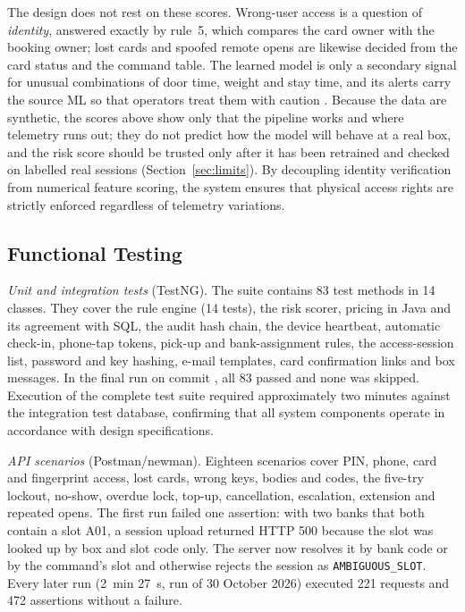 The design does not rest on these scores. Wrong-user access is a question of \emph{identity}, answered exactly by
rule~5, which compares the card owner with the booking owner; lost cards and spoofed remote opens are likewise decided
from the card status and the command table. The learned model is only a secondary signal for unusual combinations of
door time, weight and stay time, and its alerts carry the source ML so that operators treat them with caution
\cite{sommer2010outside}. Because the data are synthetic, the scores above show only that the pipeline works and where
telemetry runs out; they do not predict how the model will behave at a real box, and the risk score should be trusted
only after it has been retrained and checked on labelled real sessions (Section~\ref{sec:limits}). By decoupling
identity verification from numerical feature scoring, the system ensures that physical access rights are strictly
enforced regardless of telemetry variations.

\subsection{Functional Testing}
\label{sec:functional}

\textit{Unit and integration tests} (TestNG). The suite contains 83 test methods in 14 classes. They cover the rule
engine (14 tests), the risk scorer, pricing in Java and its agreement with SQL, the audit hash chain, the device
heartbeat, automatic check-in, phone-tap tokens, pick-up and bank-assignment rules, the access-session list, password
and key hashing, e-mail templates, card confirmation links and box messages. In the final run on commit \texttt{\measurecommit},
all 83 passed and none was skipped. Execution of the complete test suite required approximately two minutes against the
integration test database, confirming that all system components operate in accordance with design specifications.

\textit{API scenarios} (Postman/newman). Eighteen scenarios cover PIN, phone, card and fingerprint access, lost cards,
wrong keys, bodies and codes, the five-try lockout, no-show, overdue lock, top-up, cancellation, escalation, extension
and repeated opens. The first run failed one assertion: with two banks that both contain a slot A01, a session upload
returned HTTP 500 because the slot was looked up by box and slot code only. The server now resolves it by bank code or
by the command's slot and otherwise rejects the session as \texttt{AMBIGUOUS\_SLOT}. Every later run (2~min 27~s, run
of 30 October 2026) executed 221 requests and 472 assertions without a failure.

